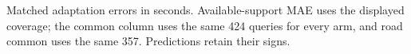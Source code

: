 \begin{table}[htbp]
\centering\small

\caption{Matched adaptation errors in seconds. Available-support MAE uses the displayed coverage;
the common column uses the same 424 queries for every arm, and road common uses the same 357.
Predictions retain their signs.}
\label{tab:revision-geometry}
\end{table}
